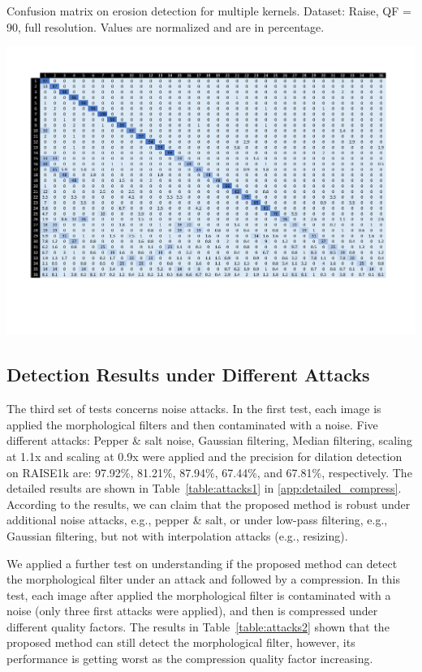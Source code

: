 \documentclass[review]{elsarticle}
\begin{document}
\begin{table}
	\centering
	\caption{Confusion matrix on erosion detection for multiple kernels. Dataset: Raise, QF = 90, full resolution. Values are normalized and are in percentage.}
	\label{table:confusion}
	\includegraphics[width=\linewidth]{confusion}
\end{table}

\subsection{Detection Results under Different Attacks}
\label{subsec:result_attacks}

The third set of tests concerns noise attacks. In the first test, each image is applied the morphological filters and then contaminated with a noise. Five different attacks: Pepper \& salt noise, Gaussian filtering, Median filtering, scaling at 1.1x and scaling at 0.9x were applied and the precision for dilation detection on RAISE1k are: 97.92\%, 81.21\%, 87.94\%, 67.44\%, and 67.81\%, respectively. The detailed results are shown in Table~\ref{table:attacks1} in \ref{app:detailed_compress}. According to the results, we can claim that the proposed method is robust under additional noise attacks, e.g., pepper \& salt, or under low-pass filtering, e.g., Gaussian filtering, but not with interpolation attacks (e.g., resizing). 

We applied a further test on understanding if the proposed method can detect the morphological filter under an attack and followed by a compression. In this test, each image after applied the morphological filter is contaminated with a noise (only three first attacks were applied), and then is compressed under different quality factors.  The results in Table~\ref{table:attacks2} shown that the proposed method can still detect the morphological filter, however, its performance is getting worst as the compression quality factor increasing.  
\end{document}
